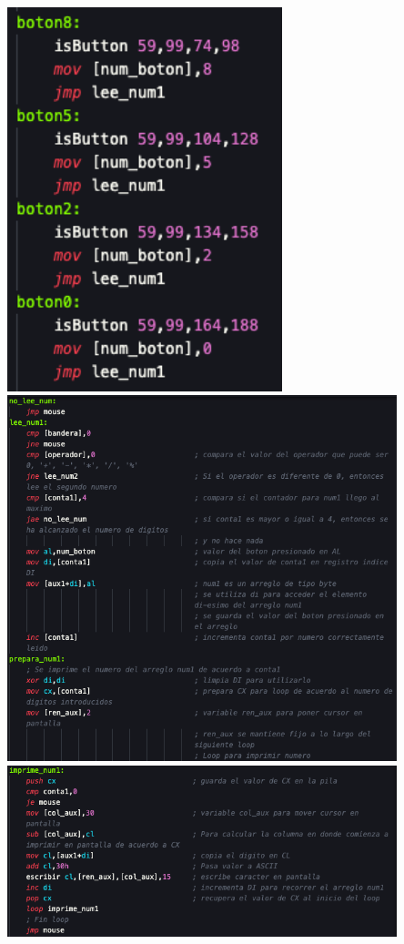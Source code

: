\documentclass[letterpaper,12 pt,titlepage]{article}
\begin{document}
    \begin{center}
        \includegraphics[width=0.6\textwidth]{img/20.png}
        \includegraphics[width=0.85\textwidth]{img/20-1.png}
        \includegraphics[width=0.85\textwidth]{img/20-2.png}
    \end{center}
\end{document}
